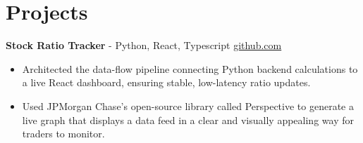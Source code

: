 \documentclass[11pt]{article}       %
\begin{document}

\vspace{-18.5pt}

\section*{Projects}

\textbf{Stock Ratio Tracker}{ - Python, React, Typescript} \hfill \href{https://github.com/Monica20030707/tradingDashboard-UI}{github.com} \\
\vspace{-9pt}
\begin{itemize}
  \item Architected the data-flow pipeline connecting Python backend calculations to a live React dashboard, ensuring stable, low-latency ratio updates. 
  \item Used JPMorgan Chase’s open-source library called Perspective to generate a live graph that displays a data feed in a clear and visually appealing way for traders to monitor.
  
\end{itemize}

\end{document}
